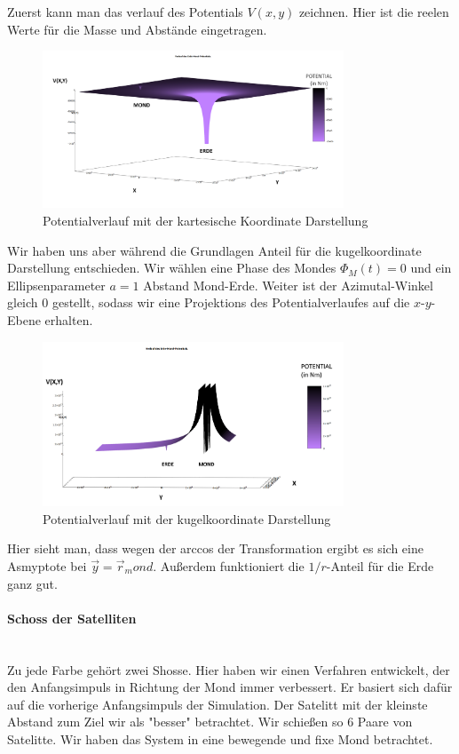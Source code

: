 \documentclass{subfiles}
\begin{document}
    Zuerst kann man das verlauf des Potentials $V(x,y)$ zeichnen. Hier ist die reelen Werte für die Masse und Abstände eingetragen.
    \begin{figure}[H]
        \centering
        \includegraphics[width=0.8\textwidth]{../Ressource/PotentialVerlauf2.png}
        \caption{Potentialverlauf mit der kartesische Koordinate Darstellung}
        \label{fig:Potential}
    \end{figure}

    Wir haben uns aber während die Grundlagen Anteil für die kugelkoordinate Darstellung entschieden. Wir wählen eine Phase des Mondes
    $\Phi_M(t) = 0$ und ein Ellipsenparameter $a = 1$ Abstand Mond-Erde. Weiter ist der Azimutal-Winkel gleich 0 gestellt, sodass wir eine Projektions
    des Potentialverlaufes auf die $x$-$y$-Ebene erhalten.
    \begin{figure}[H]
        \centering
        \includegraphics[width=0.8\textwidth]{../Ressource/PotentialVerlaufKugel.png}
        \caption{Potentialverlauf mit der kugelkoordinate Darstellung}
        \label{fig:PotentialKugel}
    \end{figure}
    Hier sieht man, dass wegen der arccos der Transformation ergibt es sich eine Asmyptote bei $\vec{y} = \vec{r}_mond$. Außerdem 
    funktioniert die $1/r$-Anteil für die Erde ganz gut.
    \paragraph{Schoss der Satelliten}$~$\\
    Zu jede Farbe gehört zwei Shosse. Hier haben wir einen Verfahren entwickelt, der den Anfangsimpuls in Richtung der Mond immer verbessert. Er basiert sich
    dafür auf die vorherige Anfangsimpuls der Simulation. Der Satelitt mit der kleinste Abstand zum Ziel wir als "besser" betrachtet.
    Wir schießen so 6 Paare von Satelitte. Wir haben das System in eine bewegende und fixe Mond betrachtet.\newline
\end{document}
